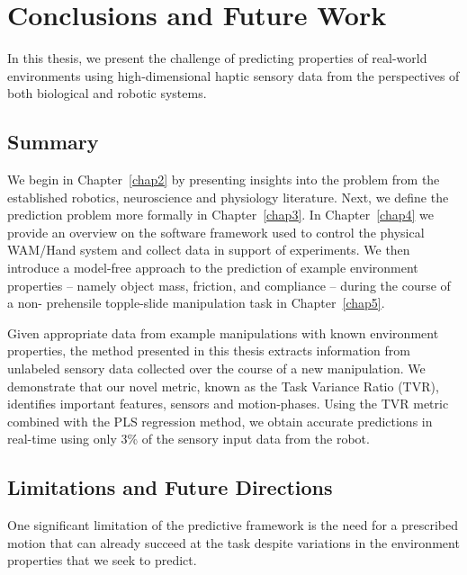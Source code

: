 \chapter{Conclusions and Future Work}
\label{chap6}

In this thesis, we present the challenge of predicting properties of real-world environments using high-dimensional haptic sensory data from the perspectives of both biological and robotic systems.

\section{Summary}

We begin in Chapter~\ref{chap2} by presenting insights into the problem from the established robotics, neuroscience and physiology literature. 
Next, we define the prediction problem more formally in Chapter~\ref{chap3}.
In Chapter~\ref{chap4} we provide an overview on the software framework used to control the physical WAM/Hand system and collect data in support of experiments.
We then introduce a model-free approach to the prediction of example environment properties -- namely object mass, friction, and compliance -- during the course of a non- prehensile topple-slide manipulation task in Chapter~\ref{chap5}.

Given appropriate data from example manipulations with known environment properties, the method  presented in this thesis extracts information from unlabeled sensory data collected over the course of a new manipulation. 
We demonstrate that our novel metric, known as the Task Variance Ratio (TVR), identifies important features, sensors and motion-phases. 
Using the TVR metric combined with the PLS regression method, we obtain accurate predictions in real-time using only 3\% of the sensory input data from the robot. 

\section{Limitations and Future Directions}

One significant limitation of the predictive framework is the need for a prescribed motion that can already succeed at the task despite variations in the environment properties that we seek to predict.

